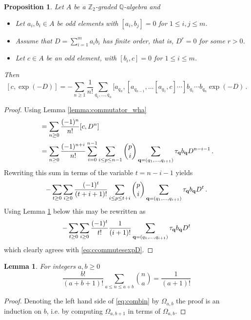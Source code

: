 \documentclass[english,letter paper,12pt,leqno]{article}
\newtheorem{proposition}[theorem]{Proposition}
\newtheorem{lemma}[theorem]{Lemma}
\theoremstyle{example}
\numberwithin{equation}{section}
\def\be{\begin{equation}}
\def\ee{\end{equation}}
\def\nZ{\mathds{Z}}
\def\nQ{\mathds{Q}}
\begin{document}
\begin{proposition}\label{prop:ccommutesexpD} Let $A$ be a $\nZ_2$-graded $\nQ$-algebra and
\begin{itemize}
\item Let $a_i, b_i \in A$ be odd elements with $[a_i,b_j] = 0$ for $1 \le i,j \le m$.
\item Assume that $D = \sum_{i=1}^m a_i b_i$ has finite order, that is, $D^r = 0$ for some $r > 0$.
\item Let $c \in A$ be an odd element, with $[b_i, c] = 0$ for $1 \le i \le m$.
\end{itemize}
Then
\be\label{eq:ccommutesexpD}
[c, \exp(-D)] = - \sum_{n \ge 1} \frac{1}{n!} \sum_{q_1,\ldots,q_n} [ a_{q_n}, [ a_{q_{n-1}}, \ldots [ a_{q_1}, c ] \cdots ] b_{q_1} \cdots b_{q_n} \exp(-D)\,.
\ee
\end{proposition}
\begin{proof}
Using Lemma \ref{lemma:commutator_wha}
\begin{align*}
[c, \exp(-D)] &= \sum_{n \ge 0} \frac{(-1)^n}{n!} [c, D^n]\\
&= \sum_{n \ge 0} \frac{(-1)^{n+i}}{n!} \sum_{i=0}^{n-1} \sum_{i \le p \le n -1} \binom{p}{i} \sum_{\bold{q} = (q_1,\ldots,q_{i+1})} \tau_{\bold{q}} b_{\bold{q}} D^{n-i-1}\,.
\end{align*}
Rewriting this sum in terms of the variable $t = n - i - 1$ yields
\[
- \sum_{t \ge 0} \sum_{i \ge 0} \frac{(-1)^{t}}{(t+i+1)!} \sum_{i \le p \le t+i}  \binom{p}{i} \sum_{\bold{q} = (q_1,\ldots,q_{i+1})} \tau_{\bold{q}} b_{\bold{q}} D^{t}\,.
\]
Using Lemma \ref{lemma:combin} below this may be rewritten as
\[
- \sum_{t \ge 0} \sum_{i \ge 0} \frac{(-1)^t}{t!} \frac{1}{(i+1)!} \sum_{\bold{q} = (q_1,\ldots,q_{i+1})} \tau_{\bold{q}} b_{\bold{q}} D^{t}
\]
which clearly agrees with \eqref{eq:ccommutesexpD}.
\end{proof}

\begin{lemma}\label{lemma:combin} For integers $a, b \ge 0$
\begin{equation}\label{eq:combin}
\frac{b!}{(a+b+1)!} \sum_{a \le n \le a + b} \binom{n}{a} = \frac{1}{(a+1)!}
\end{equation}
\end{lemma}
\begin{proof}
Denoting the left hand side of \eqref{eq:combin} by $\Omega_{a,b}$ the proof is an induction on $b$, i.e. by computing $\Omega_{a,b+1}$ in terms of $\Omega_{a,b}$.
\end{proof}
\end{document}
